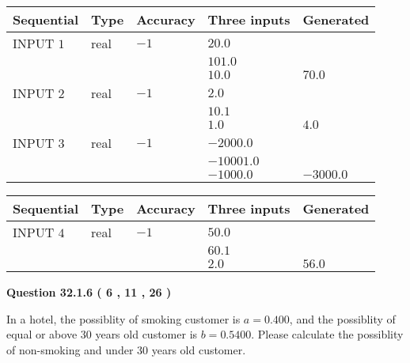 \documentclass[12pt]{article}
\begin{document}
  
\noindent\begin{tabular}{|l|l|l|l|l|}
\hline
 Sequential & Type & Accuracy & Three inputs & Generated \\ 
\hline
 
 
  INPUT $            1 $ & real & $           -1  $ & $
 20.0
  $ & \\
  & & &  $
 101.0
  $ & \\
  & & &  $
 10.0
 $ & $ 70.0 $ 
 \\  \hline  
 
 
  INPUT $            2 $ & real & $           -1  $ & $
 2.0
  $ & \\
  & & &  $
 10.1
  $ & \\
  & & &  $
 1.0
 $ & $ 4.0 $ 
 \\  \hline  
 
 
  INPUT $            3 $ & real & $           -1  $ & $
 -2000.0
  $ & \\
  & & &  $
 -10001.0
  $ & \\
  & & &  $
 -1000.0
 $ & $ -3000.0 $ 
 \\  \hline  
 \end{tabular}
   
   
  
  
\noindent\begin{tabular}{|l|l|l|l|l|}
\hline
 Sequential & Type & Accuracy & Three inputs & Generated \\ 
\hline
 
 
  INPUT $            4 $ & real & $           -1  $ & $
 50.0
  $ & \\
  & & &  $
 60.1
  $ & \\
  & & &  $
 2.0
 $ & $ 56.0 $ 
 \\  \hline  
 \end{tabular}
   
   
  
\vspace{0.2in}
  
{\textbf{\Large{Question
32.1.6 
 (           6 ,          11 ,          26 )
}}}
  
  
In a hotel, the possiblity of  %
smoking customer is
$a =  %
0.400$, and the possiblity of  %
equal or above 30 years old customer is $ b =  %
0.5400$.
Please calculate the possiblity of  %
 non-smoking and  %
under 30 years old customer.
 
 
 
\noindent{}
 
\end{document}
